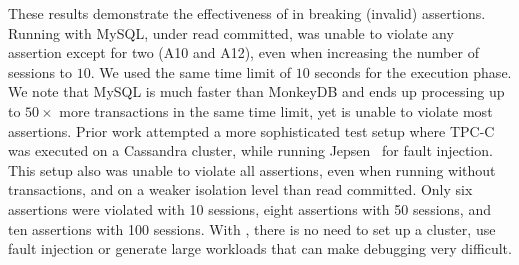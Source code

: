 


These results demonstrate the effectiveness of \tool{} in breaking (invalid) 
assertions. Running with MySQL, under read committed, was unable to violate any assertion except for
two (A10 and A12), even when increasing the number of sessions to $10$. We used
the same time limit of $10$ seconds for the execution phase. We note that MySQL
is much faster than MonkeyDB and ends up processing up to $50\times$ more
transactions in the same time limit, yet is unable to violate most assertions. 
Prior work \cite{clotho} attempted a more sophisticated test
setup where TPC-C was executed on a Cassandra cluster, while running 
Jepsen~\cite{jepsen} for fault injection. This setup also was unable to violate 
all assertions, even when running without transactions, and on a weaker isolation level than read committed. 
Only six assertions were violated with 10 sessions, 
eight assertions with 50 sessions, and ten assertions with 100 sessions.
With \tool{}, there is no need to set up a cluster, use fault injection or
generate large workloads that can make debugging very difficult. 



